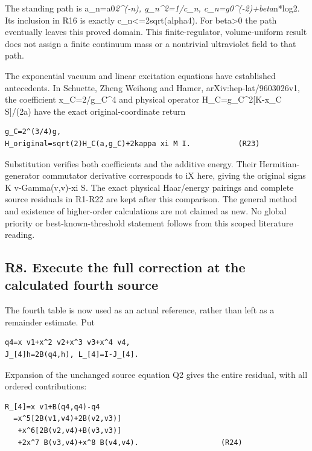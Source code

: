 \documentclass[11pt,a4paper]{article}
\renewcommand{\[}{\begingroup\small\originaldisplaystart}
\renewcommand{\]}{\originaldisplayend\endgroup}
\begin{document}
The standing path is a\_n=a0\emph{2\^{}(-n), g\_n\^{}2=1/c\_n,
c\_n=g0\^{}(-2)+beta}n*log2. Its inclusion in R16 is exactly
c\_n\textless=2sqrt(alpha4). For beta\textgreater0 the path eventually
leaves this proved domain. This finite-regulator, volume-uniform result
does not assign a finite continuum mass or a nontrivial ultraviolet
field to that path.

The exponential vacuum and linear excitation equations have established
antecedents. In Schuette, Zheng Weihong and Hamer,
arXiv:hep-lat/9603026v1, the coefficient x\_C=2/g\_C\^{}4 and physical
operator H\_C=g\_C\^{}2{[}K-x\_C S{]}/(2a) have the exact
original-coordinate return

\begin{verbatim}
g_C=2^(3/4)g,
H_original=sqrt(2)H_C(a,g_C)+2kappa xi M I.           (R23)
\end{verbatim}

Substitution verifies both coefficients and the additive energy. Their
Hermitian-generator commutator derivative corresponds to iX here, giving
the original signs K v-Gamma(v,v)-xi S. The exact physical Haar/energy
pairings and complete source residuals in R1-R22 are kept after this
comparison. The general method and existence of higher-order
calculations are not claimed as new. No global priority or
best-known-threshold statement follows from this scoped literature
reading.

\subsection{R8. Execute the full correction at the calculated fourth
source}\label{r8.-execute-the-full-correction-at-the-calculated-fourth-source}

The fourth table is now used as an actual reference, rather than left as
a remainder estimate. Put

\begin{verbatim}
q4=x v1+x^2 v2+x^3 v3+x^4 v4,
J_[4]h=2B(q4,h), L_[4]=I-J_[4].
\end{verbatim}

Expansion of the unchanged source equation Q2 gives the entire residual,
with all ordered contributions:

\begin{verbatim}
R_[4]=x v1+B(q4,q4)-q4
  =x^5[2B(v1,v4)+2B(v2,v3)]
   +x^6[2B(v2,v4)+B(v3,v3)]
   +2x^7 B(v3,v4)+x^8 B(v4,v4).                   (R24)
\end{verbatim}
\end{document}
